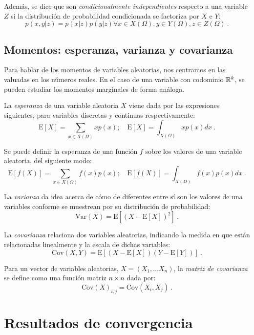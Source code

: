 Además, se dice que son \emph{condicionalmente independientes}
respecto a una variable \(Z\) si la distribución de probabilidad
condicionada se factoriza por \(X\) e \(Y\):
\[p(x,y|z)=p(x|z)p(y|z)\forall x\in X(\Omega),y\in Y(\Omega),z\in Z(\Omega)~.\]

\subsection{Momentos: esperanza, varianza y
covarianza}\label{momentos-esperanza-varianza-y-covarianza}

Para hablar de los momentos de variables aleatorias, nos centramos en las valuadas en los números reales. En el caso de una variable con codominio $\mathbb{R}^{k}$, se pueden estudiar los momentos marginales de forma análoga.

La \emph{esperanza} de una variable aleatoria \(X\) viene dada por las
expresiones siguientes, para variables discretas y continuas
respectivamente:
\[\mathrm E[X]=\sum_{x\in X(\Omega)}xp(x);\quad \mathrm E[X]=\int_{X(\Omega)}xp(x)dx~.\]


Se puede definir la esperanza de una función \(f\) sobre los valores de
una variable aleatoria, del siguiente modo:
\[\mathrm E[f(X)]=\sum_{x\in X(\Omega)}f(x)p(x);\quad \mathrm E[f(X)]=\int_{X(\Omega)}f(x)p(x)dx~.\]

La \emph{varianza} da idea acerca de cómo de diferentes entre sí son
los valores de una variables conforme se muestrean por su distribución
de probabilidad: \[\mathrm{Var}(X)=\mathrm E[(X-\mathrm E[X])^2]~.\]

La \emph{covarianza} relaciona dos variables aleatorias, indicando la
medida en que están relacionadas linealmente y la escala de dichas
variables:
\[\mathrm{Cov}(X, Y)=\mathrm E[(X-\mathrm E[X])(Y-\mathrm E[Y])]~.\]

Para un vector de variables aleatorias, \(X=(X_1, \dots X_n)\), la
\emph{matriz de covarianza} se define como una función matriz
\(n\times n\) dada por:
\[\mathrm{Cov}(X)_{i,j}=\mathrm{Cov}(X_i, X_j)~.\]

\section{Resultados de convergencia}\label{resultados-de-convergencia}

